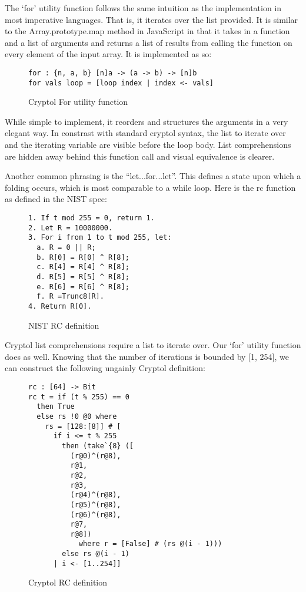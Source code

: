 The ‘for’ utility function follows the same intuition as the implementation in most 
imperative languages. That is, it iterates over the list provided. It is similar to the 
Array.prototype.map method in JavaScript in that it takes in a function and a list of 
arguments and returns a list of results from calling the function on every element of the 
input array. It is implemented as so:

\begin{figure}[h]
  \centering
\begin{verbatim}
for : {n, a, b} [n]a -> (a -> b) -> [n]b
for vals loop = [loop index | index <- vals]
\end{verbatim}
\caption{Cryptol For utility function}
\label{fig:cryptolFor}
\end{figure}

While simple to implement, it reorders and structures the arguments in a very elegant way.
In constrast with standard cryptol syntax, the list to iterate over and the iterating 
variable are visible before the loop body. List comprehensions are hidden away behind this 
function call and visual equivalence is clearer.

Another common phrasing is the “let...for...let”. This defines a state upon which a folding 
occurs, which is most comparable to a while loop. Here is the rc function as defined in the 
NIST spec:

\begin{figure}[h]
  \centering
\begin{verbatim}
1. If t mod 255 = 0, return 1.
2. Let R = 10000000.
3. For i from 1 to t mod 255, let:
  a. R = 0 || R;
  b. R[0] = R[0] ^ R[8];
  c. R[4] = R[4] ^ R[8];
  d. R[5] = R[5] ^ R[8];
  e. R[6] = R[6] ^ R[8];
  f. R =Trunc8[R].
4. Return R[0].
\end{verbatim}
\caption{NIST RC definition}
\label{fig:nistRC}
\end{figure}

Cryptol list comprehensions require a list to iterate over. Our ‘for’ utility function does 
as well. Knowing that the number of iterations is bounded by [1, 254], we can construct the 
following ungainly Cryptol definition:

\begin{figure}[h]
  \centering
\begin{verbatim}
rc : [64] -> Bit
rc t = if (t % 255) == 0 
  then True 
  else rs !0 @0 where
    rs = [128:[8]] # [
      if i <= t % 255
        then (take`{8} ([
          (r@0)^(r@8),
          r@1,
          r@2,
          r@3, 
          (r@4)^(r@8),
          (r@5)^(r@8),
          (r@6)^(r@8),
          r@7,
          r@8])
            where r = [False] # (rs @(i - 1)))
        else rs @(i - 1)
      | i <- [1..254]]
\end{verbatim}
\caption{Cryptol RC definition}
\label{fig:cryptolRC}
\end{figure}

